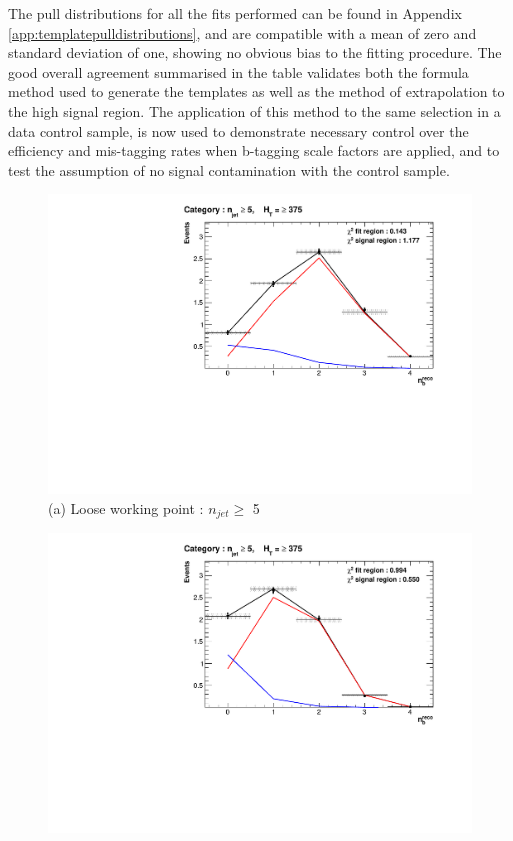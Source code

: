 The pull distributions for all the fits performed can be found in Appendix \ref{app:templatepulldistributions}, and are compatible with a mean of zero and standard deviation of one, showing no obvious bias to the fitting procedure. The good overall agreement summarised in the table validates both the formula method used to generate the templates as well as the method of extrapolation to the high \nbreco signal region. The application of this method to the same selection in a data control sample, is now used to demonstrate necessary control over the efficiency and mis-tagging rates when b-tagging scale factors are applied, and to test the assumption of no signal contamination with the \mupjets control sample.

\begin{figure}[ht]
\footnotesize
\centering
\begin{minipage}[b]{0.51 \linewidth}
\includegraphics[width = 1.0\linewidth]{plots/ThesisPlots/Final_Fit_To_MC_Normal_Loose_HTBin_OneMuon_Template_375_jet_mult_5.pdf}
\centering (a) Loose working point : $n_{jet} \geq$  5 
\end{minipage}
\quad
\begin{minipage}[b]{0.51\linewidth}
\includegraphics[width = 1.0\linewidth]{plots/ThesisPlots/Final_Fit_To_MC_Normal_Medium_HTBin_OneMuon_Template_375_jet_mult_5.pdf}

\end{minipage}
\end{figure}
